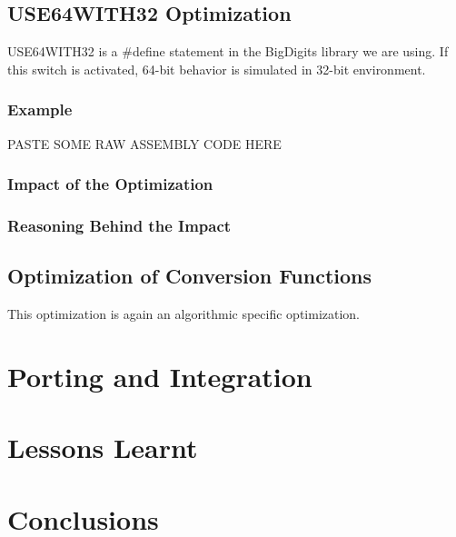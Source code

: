 \documentclass[a4paper]{article}
\begin{document}
\subsection{USE64WITH32 Optimization}
	USE64WITH32 is a $\#$define statement in the BigDigits library we are using. If this switch is activated, 64-bit behavior is simulated in 32-bit environment.
	\subsubsection{Example}
		PASTE SOME RAW ASSEMBLY CODE HERE
	\subsubsection{Impact of the Optimization}
	\subsubsection{Reasoning Behind the Impact}
\subsection{Optimization of Conversion Functions}
	This optimization is again an algorithmic specific optimization. 
\section{Porting and Integration}

\section{Lessons Learnt}

\section{Conclusions}
\end{document}
